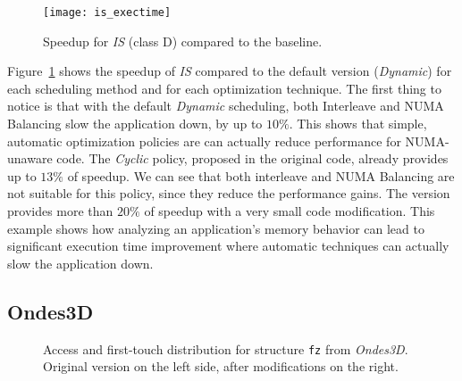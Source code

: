 \begin{figure}[htb]
    \centering
    \texttt{[image: is\_exectime]}
    \caption{Speedup for \emph{IS} (class D) compared to the baseline.}
\label{fig:is-res}
\end{figure}

Figure~\ref{fig:is-res} shows the speedup of \emph{IS} compared to
the default version (\emph{Dynamic}) for each scheduling method and for each
optimization technique. The first thing to notice is that with the default
\emph{Dynamic} scheduling, both Interleave and NUMA Balancing slow
the application down, by up to $10\%$. This shows that simple, automatic optimization policies are can actually reduce performance
for NUMA-unaware code.
The \emph{Cyclic} policy, proposed in the original code, already provides up to $13\%$ of
speedup. We can see that both interleave and NUMA Balancing are not suitable
for this policy, since they reduce the performance gains.
The \TABARNAC version provides more than $20\%$ of speedup with a very small code
modification.
This example shows how analyzing an application's memory behavior can lead to
significant execution time improvement where automatic techniques can actually slow
the application down.

\subsection{Ondes3D}
\label{sec:exp-ondes3d}

\begin{figure}[htb]
    \centering

    \caption{Access and first-touch distribution  for structure
        \texttt{fz} from \emph{Ondes3D}. Original version on the left side,
    after modifications on the right.}
    \label{fig:ondes3d}
\end{figure}

